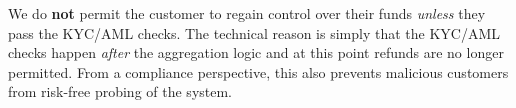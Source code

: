 We do {\bf not} permit the customer to regain control over their funds {\em
  unless} they pass the KYC/AML checks. The technical reason is simply that
the KYC/AML checks happen {\em after} the aggregation logic and at this point
refunds are no longer permitted.  From a compliance perspective, this also
prevents malicious customers from risk-free probing of the system.
